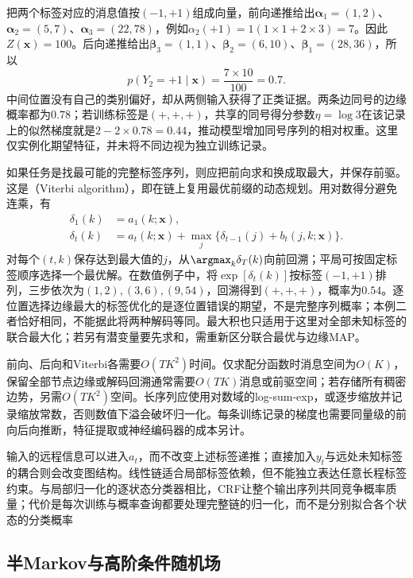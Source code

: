 把两个标签对应的消息值按$(-1,+1)$组成向量，前向递推给出$\bm{\alpha}_1=(1,2)$、$\bm{\alpha}_2=(5,7)$、$\bm{\alpha}_3=(22,78)$，例如$\alpha_2(+1)=1(1\times1+2\times3)=7$。因此$Z(\bm{x})=100$。后向递推给出$\bm{\beta}_3=(1,1)$、$\bm{\beta}_2=(6,10)$、$\bm{\beta}_1=(28,36)$，所以
\[
  p(Y_2=+1\mid\bm{x})=\frac{7\times10}{100}=0.7.
\]
中间位置没有自己的类别偏好，却从两侧输入获得了正类证据。两条边同号的边缘概率都为$0.78$；若训练标签是$(+,+,+)$，共享的同号得分参数$\eta=\log3$在该记录上的似然梯度就是$2-2\times0.78=0.44$，推动模型增加同号序列的相对权重。这里仅实例化期望特征，并未将不同边视为独立训练记录。

如果任务是找最可能的完整标签序列，则应把前向求和换成取最大，并保存前驱。这是（Viterbi algorithm），即在链上复用最优前缀的动态规划。用对数得分避免连乘，有
\begin{equation}
  \begin{aligned}
    \delta_1(k)&=a_1(k;\bm{x}),\\
    \delta_t(k)&=a_t(k;\bm{x})
       +\max_j\{\delta_{t-1}(j)+b_t(j,k;\bm{x})\}.
  \end{aligned}
  \label{eq:pgm-energy-models-viterbi}
\end{equation}
对每个$(t,k)$保存达到最大值的$j$，从$\argmax_k\delta_T(k)$向前回溯；平局可按固定标签顺序选择一个最优解。在数值例子中，将$\exp[\delta_t(k)]$按标签$(-1,+1)$排列，三步依次为$(1,2),(3,6),(9,54)$，回溯得到$(+,+,+)$，概率为$0.54$。逐位置选择边缘最大的标签优化的是逐位置错误的期望，不是完整序列概率；本例二者恰好相同，不能据此将两种解码等同。最大积也只适用于这里对全部未知标签的联合最大化；若另有潜变量要先求和，需重新区分联合最优与边缘MAP。

前向、后向和Viterbi各需要$O(TK^2)$时间。仅求配分函数时消息空间为$O(K)$，保留全部节点边缘或解码回溯通常需要$O(TK)$消息或前驱空间；若存储所有稠密边势，另需$O(TK^2)$空间。长序列应使用对数域的log-sum-exp，或逐步缩放并记录缩放常数，否则数值下溢会破坏归一化。每条训练记录的梯度也需要同量级的前向后向推断，特征提取或神经编码器的成本另计。

输入的远程信息可以进入$a_t$，而不改变上述标签递推；直接加入$y_t$与远处未知标签的耦合则会改变图结构。线性链适合局部标签依赖，但不能独立表达任意长程标签约束。与局部归一化的逐状态分类器相比，CRF让整个输出序列共同竞争概率质量；代价是每次训练与概率查询都要处理完整链的归一化，而不是分别拟合各个状态的分类概率

\subsection{半Markov与高阶条件随机场}
\label{sec:pgm-energy-models-semi-higher}

